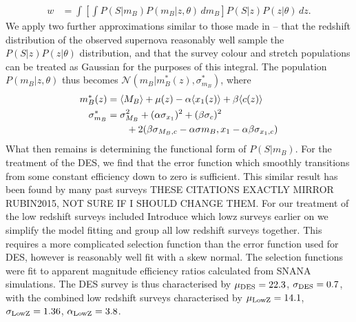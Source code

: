 \documentclass[a4paper,fleqn,usenatbib]{mnras}
\newcommand{\red}{\color{red}}
\newcommand{\rubin}{\citetalias{Rubin2015}}
\begin{document}
\begin{align}
w &= \int  \left[ \int P(S|m_B) P(m_B | z, \theta)\, d m_B \right] P(S|z) P(z|\theta)\, dz. \label{eq:w1}
\end{align}
We apply two further approximations similar to those made in {\rubin} -- that the redshift distribution of the observed supernova reasonably well sample the $P(S|z)P(z|\theta)$ distribution, and that the survey colour and stretch populations can be treated as Gaussian for the purposes of this integral. The population $P(m_B | z, \theta)$ thus becomes $\mathcal{N}(m_B|m_B^*(z), \sigma^*_{m_B})$, where
\begin{align}
m_B^*(z) &= \langle M_B \rangle + \mu(z) - \alpha \langle x_1(z) \rangle + \beta \langle c(z) \rangle \\
\sigma^*_{m_B} &= \sigma_{M_B}^2 + (\alpha \sigma_{x_1})^2 + (\beta \sigma_c)^2 \notag\\ 
&\quad\quad + 2(\beta \sigma_{M_B,c} - \alpha \sigma{m_B,x_1} - \alpha \beta \sigma_{x_1,c})
\end{align}
What then remains is determining the functional form of $P(S|m_B)$. For the treatment of the DES, we find that the error function which smoothly transitions from some constant efficiency down to zero is sufficient. This similar result has been found by many past surveys \citep{Dilday2008, Barbary2010, Perrett2012, Graur2013, Rodney2014} {\red THESE CITATIONS EXACTLY MIRROR RUBIN2015, NOT SURE IF I SHOULD CHANGE THEM}. For our treatment of the low redshift surveys included {\red Introduce which lowz surveys earlier on} we simplify the model fitting and group all low redshift surveys together. This requires a more complicated selection function than the error function used for DES, however is reasonably well fit with a skew normal. The selection functions were fit to apparent magnitude efficiency ratios calculated from SNANA simulations. The DES survey is thus characterised by $\mu_{\rm DES} = 22.3$, $\sigma_{\rm DES} = 0.7$, with the combined low redshift surveys characterised by $\mu_{\rm LowZ} = 14.1$, $\sigma_{\rm LowZ} = 1.36$, $\alpha_{\rm LowZ} = 3.8$.
\end{document}
